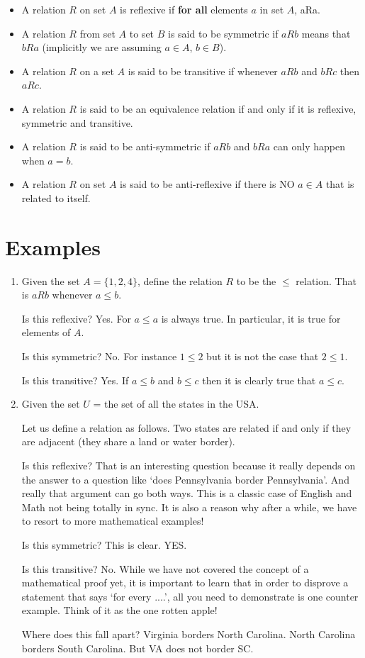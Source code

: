 \documentclass[12pt]{article}
\begin{document}
\begin{itemize}
\item A relation $R$ on set $A$ is reflexive if \textbf{for all} elements $a$ in set $A$, aRa. 
\item A relation $R$ from set $A$ to set $B$ is said to be symmetric if $aRb$ means that $bRa$ (implicitly we are assuming $a \in A$, $b \in B$).
\item A relation $R$ on a set $A$ is said to be transitive if whenever $aRb$ and $bRc$ then $aRc$. 
\item A relation $R$ is said to be an equivalence relation if and only if it is reflexive, symmetric and transitive.
\item A relation $R$ is said to be anti-symmetric if $aRb$ and $bRa$ can only happen when $a =b$.
\item A relation $R$ on set $A$ is said to be anti-reflexive if there is NO $a \in A$ that is related to itself. 
\end{itemize}

\section*{Examples}
\begin{enumerate}
\item Given the set $A = \{1, 2, 4\}$, define the relation $R$ to be the $\le$ relation. That is $aRb$ whenever $a \le b$.

Is this reflexive?  Yes. For $a \le a$ is always true. In particular, it is true for elements of $A$.

Is this symmetric? No. For instance $1 \le 2$ but it is not the case that $2 \le 1$.

Is this transitive? Yes. If $a \le b$ and $ b \le c$ then it is clearly true that $a \le c$.

\item Given the set $U$ = the set of all the states in the USA. 

Let us define a relation as follows. Two states are related if and only if they are adjacent (they share a land or water border). 

Is this reflexive? That is an interesting question because it really depends on the answer to a question like `does Pennsylvania border Pennsylvania'. And really that argument can go both ways. This is a classic case of English and Math not being totally in sync. It is also a reason why after a while, we have to resort to more mathematical examples!

Is this symmetric? This is clear. YES. 

Is this transitive? No. While we have not covered the concept of a mathematical proof yet, it is important to learn that in order to disprove a statement that says `for every ....', all you need to demonstrate is one counter example. Think of it as the one rotten apple!

Where does this fall apart? Virginia borders North Carolina. North Carolina borders South Carolina. But VA does not border SC. 

\end{enumerate}
\end{document}
